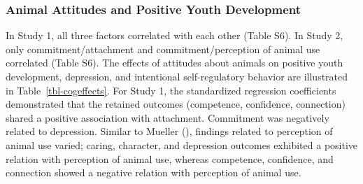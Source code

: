 \documentclass[
  jou,
  longtable,
  nolmodern,
  notxfonts,
  notimes,
  colorlinks=true,linkcolor=blue,citecolor=blue,urlcolor=blue]{apa7}
\newlength\Oldarrayrulewidth
\newlength\Oldtabcolsep
\begin{document}

\subsubsection{Animal Attitudes and Positive Youth
Development}\label{animal-attitudes-and-positive-youth-development}

In Study 1, all three factors correlated with each other (Table S6). In
Study 2, only commitment/attachment and commitment/perception of animal
use correlated (Table S6). The effects of attitudes about animals on
positive youth development, depression, and intentional self-regulatory
behavior are illustrated in Table~\ref{tbl-cogeffects}. For Study 1, the
standardized regression coefficients demonstrated that the retained
outcomes (competence, confidence, connection) shared a positive
association with attachment. Commitment was negatively related to
depression. Similar to Mueller (),
findings related to perception of animal use varied; caring, character,
and depression outcomes exhibited a positive relation with perception of
animal use, whereas competence, confidence, and connection showed a
negative relation with perception of animal use.
\end{document}
